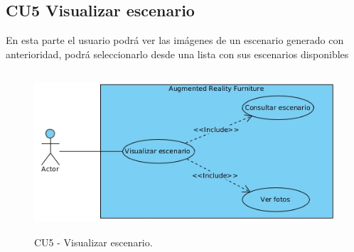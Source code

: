 \subsection{CU5 Visualizar escenario}\par
En esta parte el usuario podrá ver las imágenes de un escenario generado con anterioridad, podrá seleccionarlo desde una lista con sus escenarios disponibles
\begin{figure}[h!]
	\centering
	\includegraphics[width=12cm,height=6cm]{imagenes/analisis/visualizarEscenario.jpg}
	\caption{CU5 - Visualizar escenario.}
	\label{fig:analogo}
\end{figure}